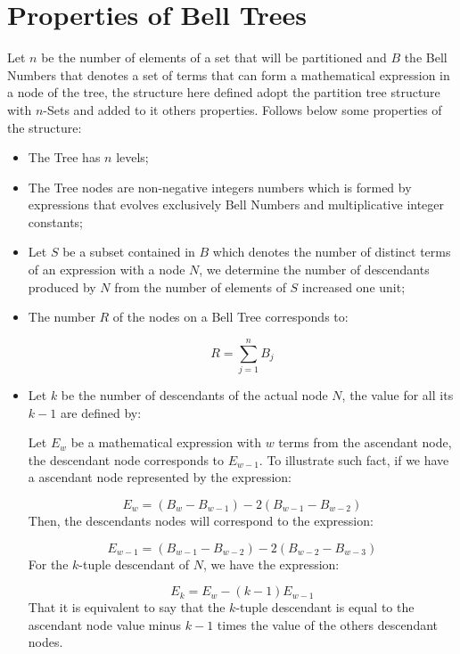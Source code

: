 \documentclass {amsart}
\begin{document}
\section*{Properties of Bell Trees}

Let {$n$} be the number of elements of a set that will be
partitioned and {$B$} the Bell Numbers that denotes a set of terms
that can form a mathematical expression in a node of the tree, the
structure here defined adopt the partition tree structure with
{$n$}-Sets and added to it others properties. Follows below some
properties of the structure:

\begin{itemize}

\item The Tree has {$n$} levels;

\item The Tree nodes are non-negative integers numbers which is
formed by expressions that evolves exclusively Bell Numbers and
multiplicative integer constants;

\item Let {$S$} be a subset contained in {$B$} which denotes the
number of distinct terms of an expression with a node {$N$}, we
determine the number of descendants produced by {$N$} from the
number of elements of {$S$} increased one unit;

\item The number {$R$} of the nodes on a Bell Tree corresponds to:

\begin{equation} \label{eq3}
R = \sum_{j=1}^{n}B_j
\end{equation}

\item Let {$k$} be the number of descendants of the actual node
{$N$}, the value for all its {$k-1$} are defined by:

Let {$E_w$} be a mathematical expression with {$w$} terms from the
ascendant node, the descendant node corresponds to {$E_{w-1}$}.
To illustrate such fact, if we have a ascendant node represented
by the expression:

\begin{equation} \label{eq4}
E_w = (B_w - B_{w-1}) - 2(B_{w-1} - B_{w-2})
\end{equation}
Then, the descendants nodes will correspond to the expression:

\begin{equation} \label{eq5}
E_{w-1} = (B_{w-1} - B_{w-2}) - 2(B_{w-2} - B_{w-3})
\end{equation}
For the {$k$}-tuple descendant of {$N$}, we have the expression:

\begin{equation} \label{eq6}
E_k = E_w - (k-1)E_{w-1}
\end{equation}
That it is equivalent to say that the {$k$}-tuple descendant is
equal to the ascendant node value minus {$k-1$} times the value of
the others descendant nodes.

\end{itemize}
\end{document}
